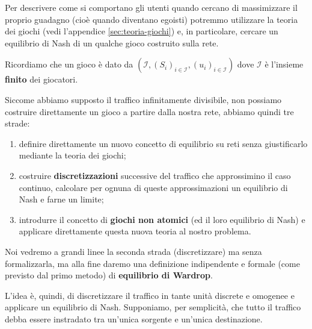 \documentclass[a4paper]{article}
\theoremstyle{plain}
\theoremstyle{definition}
\theoremstyle{remark}
\newcommand{\pa}[1]{\left(#1\right)}
\begin{document}
Per descrivere come si comportano gli utenti quando cercano di
massimizzare il proprio guadagno (cioè quando diventano egoisti)
potremmo utilizzare la teoria dei giochi (vedi l'appendice
\ref{sec:teoria-giochi}) e, in particolare, cercare un equilibrio di
Nash di un qualche gioco costruito sulla rete.

Ricordiamo che un gioco è dato da
$\pa{\mathcal{I}, \pa{S_i}_{i\in\mathcal{I}},
  \pa{u_i}_{i\in\mathcal{I}}}$ dove $\mathcal{I}$ è l'insieme
\textbf{finito} dei giocatori.

Siccome abbiamo supposto il traffico infinitamente divisibile, non
possiamo costruire direttamente un gioco a partire dalla nostra rete,
abbiamo quindi tre strade:
\begin{enumerate}
\item definire direttamente un nuovo concetto di equilibrio su reti
  senza giustificarlo mediante la teoria dei giochi;
\item costruire \textbf{discretizzazioni} successive del traffico che
  approssimino il caso continuo, calcolare per ognuna di queste
  approssimazioni un equilibrio di Nash e farne un limite;
\item introdurre il concetto di \textbf{giochi non atomici} (ed il
  loro equilibrio di Nash) e applicare direttamente questa nuova
  teoria al nostro problema.
\end{enumerate}

Noi vedremo a grandi linee la seconda strada (discretizzare) ma senza
formalizzarla, ma alla fine daremo una definizione indipendente e
formale (come previsto dal primo metodo) di \textbf{equilibrio di
  Wardrop}.

L'idea è, quindi, di discretizzare il traffico in tante unità discrete
e omogenee e applicare un equilibrio di Nash. Supponiamo, per
semplicità, che tutto il traffico debba essere instradato tra un'unica
sorgente e un'unica destinazione.
\end{document}
